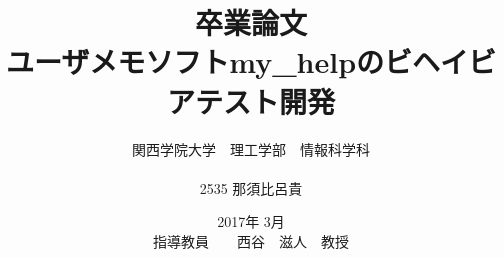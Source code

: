 \title{卒業論文\\
\vspace{4cm} ユーザメモソフトmy\_helpのビヘイビアテスト開発}
\author{ 関西学院大学　理工学部　情報科学科\\\\2535 那須比呂貴}
\date{\vspace{3cm} 2017年  3月\\
\vspace{3cm} 指導教員　　西谷　滋人　教授}
\maketitle
\setcounter{tocdepth}{4}
\tableofcontents

